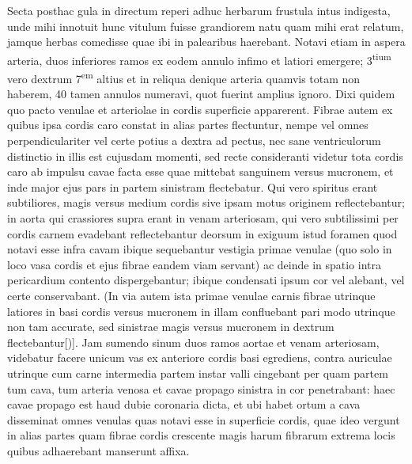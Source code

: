 \pstart%
Secta posthac gula in directum reperi adhuc herbarum frustula intus indigesta, unde mihi innotuit hunc vitulum fuisse grandiorem natu quam mihi erat relatum, jamque herbas comedisse quae ibi in palearibus haerebant.%
\pend%
\pstart%
Notavi etiam in aspera arteria, duos inferiores ramos ex eodem annulo infimo et latiori emergere; 3\textsuperscript{tium} vero dextrum 7\textsuperscript{em} altius et in reliqua denique arteria quamvis totam non haberem, 40 tamen annulos numeravi, quot fuerint amplius ignoro.
\pend%
\pstart%
Dixi quidem 
quo pacto venulae et arteriolae in cordis superficie apparerent. Fibrae autem ex quibus ipsa cordis caro constat in alias partes flectuntur, nempe vel omnes perpendiculariter vel certe potius a dextra ad pectus, nec sane ventriculorum distinctio in illis est cujusdam momenti, sed recte consideranti videtur tota cordis caro ab impulsu cavae facta esse quae mittebat sanguinem versus mucronem, et inde major ejus pars in partem sinistram flectebatur. Qui vero spiritus erant subtiliores, magis versus medium cordis sive ipsam motus originem reflectebantur;
in aorta qui crassiores supra erant in venam arteriosam, qui vero subtilissimi per cordis carnem evadebant reflectebantur deorsum in exiguum istud foramen quod
notavi %
esse infra cavam ibique sequebantur vestigia primae venulae (quo solo in loco vasa cordis
 et ejus fibrae eandem viam
\pend
\newpage
\pstart\noindent servant) ac deinde in spatio intra pericardium contento dispergebantur; ibique condensati ipsum cor vel alebant, vel certe conservabant. (In via autem ista primae venulae carnis fibrae utrinque latiores in basi cordis versus mucronem in illam confluebant pari modo utrinque non tam accurate, sed sinistrae magis versus mucronem in dextrum flectebantur[)]. Jam sumendo sinum duos ramos aortae et venam arteriosam, videbatur facere unicum vas ex anteriore cordis basi egrediens, contra auriculae utrinque cum carne intermedia partem instar valli cingebant per quam partem tum cava, tum arteria venosa et cavae propago sinistra in cor penetrabant: haec cavae propago est haud dubie coronaria dicta, et ubi habet ortum a cava disseminat omnes venulas quas  notavi esse in superficie cordis, quae ideo vergunt in alias partes quam fibrae  cordis crescente magis  harum fibrarum extrema locis quibus adhaerebant manserunt affixa.

